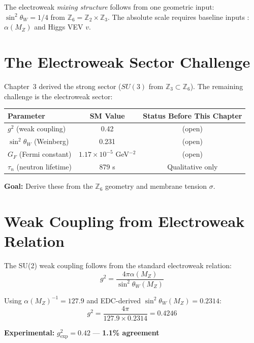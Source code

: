 The electroweak \emph{mixing structure} follows from one geometric input: $\sin^2\theta_W = 1/4$ from $\mathbb{Z}_6 = \mathbb{Z}_2 \times \mathbb{Z}_3$.
The absolute scale requires baseline inputs \tagBL{}: $\alpha(M_Z)$ and Higgs VEV $v$.

\section{The Electroweak Sector Challenge}
\label{sec:ch3_challenge}

Chapter~3 derived the strong sector ($SU(3)$ from $\mathbb{Z}_3 \subset \mathbb{Z}_6$).
The remaining challenge is the electroweak sector:

\begin{center}
\begin{tabular}{lcc}
\toprule
\textbf{Parameter} & \textbf{SM Value} & \textbf{Status Before This Chapter} \\
\midrule
$g^2$ (weak coupling) & 0.42 & (open) \\
$\sin^2\theta_W$ (Weinberg) & 0.231 & (open) \\
$G_F$ (Fermi constant) & $1.17 \times 10^{-5}$ GeV$^{-2}$ & (open) \\
$\tau_n$ (neutron lifetime) & 879 s & Qualitative only \\
\bottomrule
\end{tabular}
\end{center}

\textbf{Goal:} Derive these from the $\mathbb{Z}_6$ geometry and membrane tension $\sigma$.

\section{Weak Coupling from Electroweak Relation}
\label{sec:ch3_weak_coupling}

\begin{theorem}
\label{thm:ch3_g2}
\tagDc{}
The SU(2) weak coupling follows from the standard electroweak relation:
\begin{equation}
g^2 = \frac{4\pi\alpha(M_Z)}{\sin^2\theta_W(M_Z)}
\end{equation}

Using $\alpha(M_Z)^{-1} = 127.9$ \tagBL{} and EDC-derived $\sin^2\theta_W(M_Z) = 0.2314$:
\begin{equation}
\boxed{g^2 = \frac{4\pi}{127.9 \times 0.2314} = 0.4246}
\end{equation}

\textbf{Experimental:} $g^2_{\text{exp}} = 0.42$ \tagBL{} --- \textbf{1.1\% agreement}
\end{theorem}

